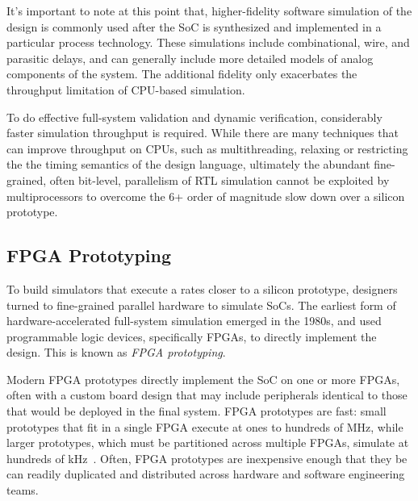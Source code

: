 It's important to note at this point that, higher-fidelity software simulation
of the design is commonly used after the SoC is synthesized and implemented in
a particular process technology.  These simulations include combinational,
wire, and parasitic delays, and can generally include more detailed models of
analog components of the system. The additional fidelity only exacerbates the
throughput limitation of CPU-based simulation.

To do effective full-system validation and dynamic verification, considerably
faster simulation throughput is required. While there are many techniques that
can improve throughput on CPUs, such as multithreading, relaxing or restricting
the the timing semantics of the design language, ultimately the abundant
fine-grained, often bit-level, parallelism of RTL simulation cannot be exploited
by multiprocessors to overcome the 6+ order of magnitude slow down over a
silicon prototype.

\subsection{FPGA Prototyping}\label{sec:fpga-prototyping}

To build simulators that execute a rates closer to a silicon prototype, designers turned
to fine-grained parallel hardware to simulate SoCs.  The earliest form of
hardware-accelerated full-system simulation emerged in the 1980s, and used
programmable logic devices, specifically FPGAs, to directly implement the
design. This is known as \emph{FPGA prototyping}.

Modern FPGA prototypes directly implement the SoC on one or more
FPGAs, often with a custom board design that may include peripherals
identical to those that would be deployed in the final system.  FPGA prototypes
are fast: small prototypes that fit in a single FPGA execute at ones to hundreds of
MHz, while larger prototypes, which must be partitioned across multiple FPGAs,
simulate at hundreds of kHz~\cite{nehalemprototype, atomprototype}.
Often, FPGA prototypes are inexpensive enough that they be can readily
duplicated and distributed across hardware and software engineering teams.

